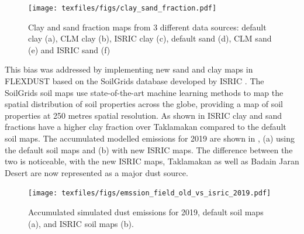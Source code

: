 \begin{figure}[hptb]
    \centering
    \texttt{[image: texfiles/figs/clay\_sand\_fraction.pdf]}
    \caption{Clay and sand fraction maps from 3 different data sources: default clay (a), CLM clay (b), ISRIC clay (c), default sand (d), CLM sand (e) and ISRIC sand (f)}
    \label{fig:clay_sand_fraction_comparison}
\end{figure}

This bias was addressed by implementing new sand and clay maps in FLEXDUST based on the SoilGrids database developed by ISRIC \parencite{soil-grid_ref}.  The SoilGrids soil maps use state-of-the-art machine learning methods to map the spatial distribution of soil properties across the globe,
providing a map of soil properties at 250 metres spatial resolution. 
As shown in  ISRIC clay and sand fractions have a higher clay fraction over Taklamakan compared to the default soil maps. 
The accumulated modelled emissions for 2019 are shown in , (a) using the default soil maps and (b) with new ISRIC maps. 
The difference between the two is noticeable, with the new ISRIC maps, Taklamakan as well as Badain Jaran Desert are now represented as a major dust source.

\begin{figure}[htpb]
    \centering
    \texttt{[image: texfiles/figs/emssion\_field\_old\_vs\_isric\_2019.pdf]}
    \caption{Accumulated simulated dust emissions for 2019, default soil maps (a), and ISRIC soil maps (b).}
    \label{fig:emissions_ISRIC_old_com}
\end{figure}
